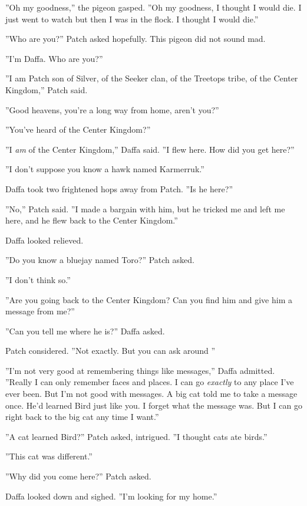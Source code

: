 \documentclass[12pt]{book}
\begin{document}
 ''Oh my goodness,'' the pigeon gasped. ''Oh my goodness, I thought I would die. I just went to watch but then I was in the flock. I thought I would die.''\par
 ''Who are you?'' Patch asked hopefully. This pigeon did not sound mad.\par
 ''I'm Daffa. Who are you?''\par
 ''I am Patch son of Silver, of the Seeker clan, of the Treetops tribe, of the Center Kingdom,'' Patch said.\par
 ''Good heavens, you're a long way from home, aren't you?''\par
 ''You've heard of the Center Kingdom?''\par
 ''I {\it am} of the Center Kingdom,'' Daffa said. ''I flew here. How did you get here?''\par
 ''I don't suppose you know a hawk named Karmerruk.''\par
 Daffa took two frightened hops away from Patch. ''Is he here?''\par
 ''No,'' Patch said. ''I made a bargain with him, but he tricked me and left me here, and he flew back to the Center Kingdom.''\par
 Daffa looked relieved.\par
 ''Do you know a bluejay named Toro?'' Patch asked.\par
 ''I don't think so.''\par
 ''Are you going back to the Center Kingdom? Can you find him and give him a message from me?''\par
 ''Can you tell me where he is?'' Daffa asked.\par
 Patch considered. ''Not exactly. But you can ask around%
''\par
 ''I'm not very good at remembering things like messages,'' Daffa admitted. ''Really I can only remember faces and places. I can go {\it exactly} to any place I've ever been. But I'm not good with messages. A big cat told me to take a message once. He'd learned Bird just like you. I forget what the message was. But I can go right back to the big cat any time I want.''\par
 ''A cat learned Bird?'' Patch asked, intrigued. ''I thought cats ate birds.''\par
 ''This cat was different.''\par
 ''Why did you come here?'' Patch asked.\par
 Daffa looked down and sighed. ''I'm looking for my home.''\par
\end{document}
